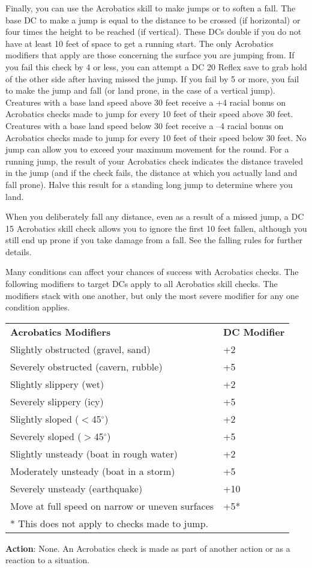 Finally, you can use the Acrobatics skill to make jumps or to soften a fall. The base DC to make a jump is equal to the distance to be crossed (if horizontal) or four times the height to be reached (if vertical). These DCs double if you do not have at least 10 feet of space to get a running start. The only Acrobatics modifiers that apply are those concerning the surface you are jumping from. If you fail this check by 4 or less, you can attempt a DC 20 Reflex save to grab hold of the other side after having missed the jump. If you fail by 5 or more, you fail to make the jump and fall (or land prone, in the case of a vertical jump). Creatures with a base land speed above 30 feet receive a +4 racial bonus on Acrobatics checks made to jump for every 10 feet of their speed above 30 feet. Creatures with a base land speed below 30 feet receive a --4 racial bonus on Acrobatics checks made to jump for every 10 feet of their speed below 30 feet. No jump can allow you to exceed your maximum movement for the round. For a running jump, the result of your Acrobatics check indicates the distance traveled in the jump (and if the check fails, the distance at which you actually land and fall prone). Halve this result for a standing long jump to determine where you land.
				
When you deliberately fall any distance, even as a result of a missed jump, a DC 15 Acrobatics skill check allows you to ignore the first 10 feet fallen, although you still end up prone if you take damage from a fall. See the falling rules for further details.
				
Many conditions can affect your chances of success with Acrobatics checks. The following modifiers to target DCs apply to all Acrobatics skill checks. The modifiers stack with one another, but only the most severe modifier for any one condition applies.
\begin{table}
\sffamily
 \begin{tabular}{ll}
\textbf{Acrobatics Modifiers} & \textbf{DC Modifier}\\
Slightly obstructed (gravel, sand) & +2\\
Severely obstructed (cavern, rubble) & +5\\
Slightly slippery (wet) & +2\\
Severely slippery (icy) & +5\\
Slightly sloped (\mbox{$<$}45\mbox{${}^\circ$})& +2 \\
Severely sloped (\mbox{$>$}45\mbox{${}^\circ$}) & +5\\
Slightly unsteady (boat in rough water) & +2\\
Moderately unsteady (boat in a storm) & +5\\
Severely unsteady (earthquake) & +10\\
Move at full speed on narrow or uneven surfaces & +5*\\  
* This does not apply to checks made to jump.
 \end{tabular}
\end{table}		
\textbf{Action}: None. An Acrobatics check is made as part of another action or as a reaction to a situation.
				
